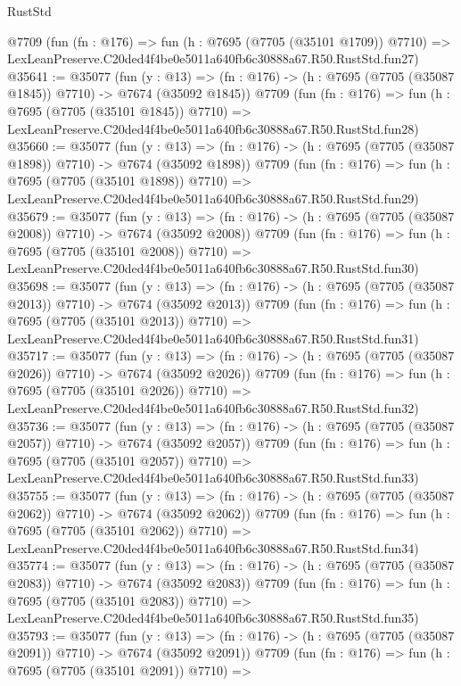 \begin{lexlean}{RustStd}
\begin{coremodule}
    @7709
    (fun (fn : @176) =>
    fun (h : @7695 (@7705 (@35101 @1709)) @7710) =>
    LexLeanPreserve.C20ded4f4be0e5011a640fb6c30888a67.R50.RustStd.fun27)
@35641 := @35077
    (fun (y : @13) =>
    (fn : @176) -> (h : @7695 (@7705 (@35087 @1845)) @7710) -> @7674 (@35092 @1845))
    @7709
    (fun (fn : @176) =>
    fun (h : @7695 (@7705 (@35101 @1845)) @7710) =>
    LexLeanPreserve.C20ded4f4be0e5011a640fb6c30888a67.R50.RustStd.fun28)
@35660 := @35077
    (fun (y : @13) =>
    (fn : @176) -> (h : @7695 (@7705 (@35087 @1898)) @7710) -> @7674 (@35092 @1898))
    @7709
    (fun (fn : @176) =>
    fun (h : @7695 (@7705 (@35101 @1898)) @7710) =>
    LexLeanPreserve.C20ded4f4be0e5011a640fb6c30888a67.R50.RustStd.fun29)
@35679 := @35077
    (fun (y : @13) =>
    (fn : @176) -> (h : @7695 (@7705 (@35087 @2008)) @7710) -> @7674 (@35092 @2008))
    @7709
    (fun (fn : @176) =>
    fun (h : @7695 (@7705 (@35101 @2008)) @7710) =>
    LexLeanPreserve.C20ded4f4be0e5011a640fb6c30888a67.R50.RustStd.fun30)
@35698 := @35077
    (fun (y : @13) =>
    (fn : @176) -> (h : @7695 (@7705 (@35087 @2013)) @7710) -> @7674 (@35092 @2013))
    @7709
    (fun (fn : @176) =>
    fun (h : @7695 (@7705 (@35101 @2013)) @7710) =>
    LexLeanPreserve.C20ded4f4be0e5011a640fb6c30888a67.R50.RustStd.fun31)
@35717 := @35077
    (fun (y : @13) =>
    (fn : @176) -> (h : @7695 (@7705 (@35087 @2026)) @7710) -> @7674 (@35092 @2026))
    @7709
    (fun (fn : @176) =>
    fun (h : @7695 (@7705 (@35101 @2026)) @7710) =>
    LexLeanPreserve.C20ded4f4be0e5011a640fb6c30888a67.R50.RustStd.fun32)
@35736 := @35077
    (fun (y : @13) =>
    (fn : @176) -> (h : @7695 (@7705 (@35087 @2057)) @7710) -> @7674 (@35092 @2057))
    @7709
    (fun (fn : @176) =>
    fun (h : @7695 (@7705 (@35101 @2057)) @7710) =>
    LexLeanPreserve.C20ded4f4be0e5011a640fb6c30888a67.R50.RustStd.fun33)
@35755 := @35077
    (fun (y : @13) =>
    (fn : @176) -> (h : @7695 (@7705 (@35087 @2062)) @7710) -> @7674 (@35092 @2062))
    @7709
    (fun (fn : @176) =>
    fun (h : @7695 (@7705 (@35101 @2062)) @7710) =>
    LexLeanPreserve.C20ded4f4be0e5011a640fb6c30888a67.R50.RustStd.fun34)
@35774 := @35077
    (fun (y : @13) =>
    (fn : @176) -> (h : @7695 (@7705 (@35087 @2083)) @7710) -> @7674 (@35092 @2083))
    @7709
    (fun (fn : @176) =>
    fun (h : @7695 (@7705 (@35101 @2083)) @7710) =>
    LexLeanPreserve.C20ded4f4be0e5011a640fb6c30888a67.R50.RustStd.fun35)
@35793 := @35077
    (fun (y : @13) =>
    (fn : @176) -> (h : @7695 (@7705 (@35087 @2091)) @7710) -> @7674 (@35092 @2091))
    @7709
    (fun (fn : @176) =>
    fun (h : @7695 (@7705 (@35101 @2091)) @7710) =>

\end{coremodule}
\end{lexlean}
